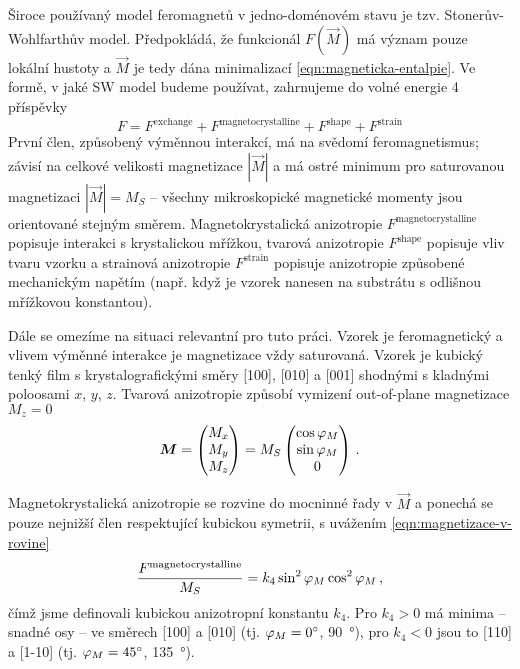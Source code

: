 Široce používaný model feromagnetů v jedno-doménovém stavu je tzv. Stonerův-Wohlfarthův model\cite{stonerMechanismMagneticHysteresis1991}.
Předpokládá, že funkcionál $F(\vec{M})$ má význam pouze lokální hustoty a $\vec{M}$ je tedy dána minimalizací \eqref{eqn:magneticka-entalpie}.
Ve formě, v jaké SW model budeme používat, zahrnujeme do volné energie 4 příspěvky\cite{reichlovaUltrarychlaLaserovaSpektroskopie2010,jandaDynamikaSpinovePolarizace2012,kucharikStudiumSpinovePolarizace2015}
\begin{equation}
    F=F^\textrm{exchange} + F^\textrm{magnetocrystalline} + F^\textrm{shape} + F^\textrm{strain}
\end{equation}
První člen, způsobený výměnnou interakcí, má na svědomí feromagnetismus; závisí na celkové velikosti magnetizace $|\vec{M}|$ a má ostré minimum pro saturovanou magnetizaci $|\vec{M}|=M_S$ -- všechny mikroskopické magnetické momenty jsou orientované stejným směrem.
Magnetokrystalická anizotropie $F^\textrm{magnetocrystalline}$ popisuje interakci s krystalickou mřížkou, tvarová anizotropie $F^\textrm{shape}$ popisuje vliv tvaru vzorku a strainová anizotropie $F^\textrm{strain}$ popisuje anizotropie způsobené mechanickým napětím (např. když je vzorek nanesen na substrátu s odlišnou mřížkovou konstantou).

Dále se omezíme na situaci relevantní pro tuto práci.
Vzorek je feromagnetický a vlivem výměnné interakce je magnetizace vždy saturovaná.
Vzorek je kubický tenký film s krystalografickými směry [100], [010] a [001] shodnými s kladnými poloosami $x$, $y$, $z$.
Tvarová anizotropie způsobí vymizení out-of-plane magnetizace $M_z=0$
\begin{equation}
\label{eqn:magnetizace-v-rovine}
    \bm{M}=\begin{pmatrix} M_x \\ M_y \\ M_z \end{pmatrix}
    = M_S \begin{pmatrix} \cos \varphi_M \\ \sin \varphi_M \\ 0 \end{pmatrix} \,.
\end{equation}

Magnetokrystalická anizotropie se rozvine do mocninné řady v $\vec{M}$ a ponechá se pouze nejnižší člen respektující kubickou symetrii, s uvážením \eqref{eqn:magnetizace-v-rovine}
\begin{equation}
    \frac{F^\textrm{magnetocrystalline}}{M_S}=k_4 \sin^2 \varphi_M \cos^2 \varphi_M \,,
\end{equation}
čímž jsme definovali kubickou anizotropní konstantu $k_4$.
Pro $k_4>0$ má minima -- snadné osy -- ve směrech [100] a [010] (tj. $\varphi_M=\SI{0}{\degree}$, \SI{90}{\degree}), pro $k_4<0$ jsou to [110] a [1-10] (tj. $\varphi_M=\SI{45}{\degree}$, \SI{135}{\degree}).

